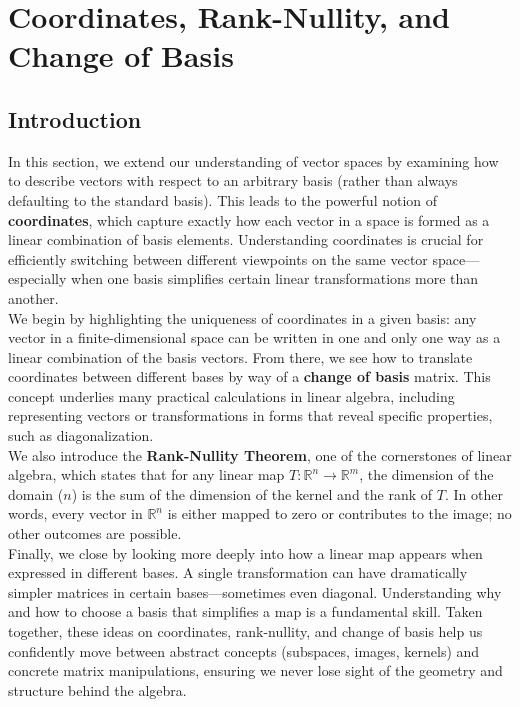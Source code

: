 \documentclass[a4paper, 9pt]{extarticle}
\begin{document}
\section{Coordinates, Rank-Nullity, and Change of Basis}
\subsection*{Introduction}
\noindent In this section, we extend our understanding of vector spaces by examining how to describe vectors with respect to an arbitrary basis (rather than always defaulting to the standard basis). This leads to the powerful notion of \textbf{coordinates}, which capture exactly how each vector in a space is formed as a linear combination of basis elements. Understanding coordinates is crucial for efficiently switching between different viewpoints on the same vector space—especially when one basis simplifies certain linear transformations more than another. \\[2ex]
\noindent We begin by highlighting the uniqueness of coordinates in a given basis: any vector in a finite-dimensional space can be written in one and only one way as a linear combination of the basis vectors. From there, we see how to translate coordinates between different bases by way of a \textbf{change of basis} matrix. This concept underlies many practical calculations in linear algebra, including representing vectors or transformations in forms that reveal specific properties, such as diagonalization. \\[2ex]
\noindent We also introduce the \textbf{Rank-Nullity Theorem}, one of the cornerstones of linear algebra, which states that for any linear map $T:\mathbb{R}^n \to \mathbb{R}^m$, the dimension of the domain ($n$) is the sum of the dimension of the kernel and the rank of $T$. In other words, every vector in $\mathbb{R}^n$ is either mapped to zero or contributes to the image; no other outcomes are possible. \\[2ex]
\noindent Finally, we close by looking more deeply into how a linear map appears when expressed in different bases. A single transformation can have dramatically simpler matrices in certain bases—sometimes even diagonal. Understanding why and how to choose a basis that simplifies a map is a fundamental skill. Taken together, these ideas on coordinates, rank-nullity, and change of basis help us confidently move between abstract concepts (subspaces, images, kernels) and concrete matrix manipulations, ensuring we never lose sight of the geometry and structure behind the algebra.
\end{document}
